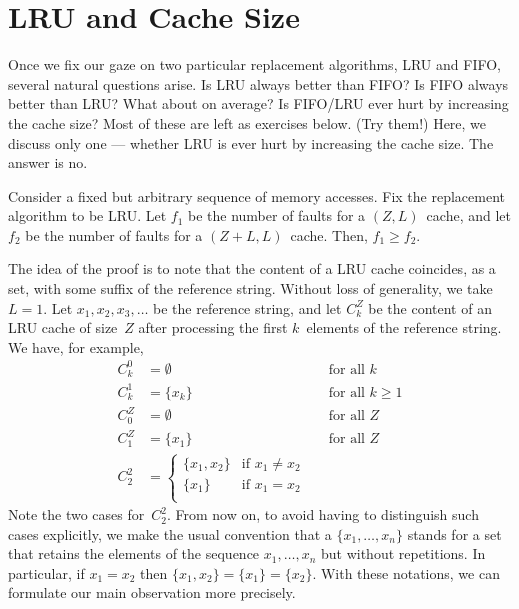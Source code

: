 \section{LRU and Cache Size}

Once we fix our gaze on two particular replacement algorithms,
  LRU and FIFO,
  several natural questions arise.
Is LRU always better than FIFO?
Is FIFO always better than LRU?
What about on average?
Is FIFO/LRU ever hurt by increasing the cache size?
Most of these are left as exercises below.
(Try them!)
Here, we discuss only one ---
  whether LRU is ever hurt by increasing the cache size.
The answer is no.

\begin{theorem}\label{thm:lru-monotone}
Consider a fixed but arbitrary sequence of memory accesses.
Fix the replacement algorithm to be LRU\null.
Let $f_1$ be the number of faults for a $(Z,L)$~cache,
  and let $f_2$ be the number of faults for a $(Z+L,L)$~cache.
Then, $f_1 \ge f_2$.
\end{theorem}

The idea of the proof is to note that the content of a LRU cache
  coincides, as a set, with some suffix of the reference string.
Without loss of generality, we take $L=1$.
Let $x_1,x_2,x_3,\ldots$ be the reference string,
  and let $C^Z_k$ be the content of an LRU cache of size~$Z$
    after processing the first $k$~elements of the reference string.
We have, for example,
\begin{align}
  C^0_k &= \emptyset
    &&\text{for all $k$}
\\
  C^1_k &= \{x_k\}
    &&\text{for all $k \ge 1$}
\\
  C^Z_0 &= \emptyset
    &&\text{for all $Z$}
\\
  C^Z_1 &= \{x_1\}
    &&\text{for all $Z$}
\\
  C^2_2 &=
  \begin{cases}
  \{x_1,x_2\} & \text{if $x_1 \ne x_2$} \\
  \{x_1\} & \text{if $x_1 = x_2$} \\
  \end{cases}
\end{align}
Note the two cases for~$C^2_2$.
From now on, to avoid having to distinguish such cases explicitly,
  we make the usual convention that a $\{x_1,\ldots,x_n\}$
  stands for a set that retains the elements of the sequence $x_1,\ldots,x_n$
    but without repetitions.
In particular, if $x_1=x_2$ then $\{x_1,x_2\}=\{x_1\}=\{x_2\}$.
With these notations,
  we can formulate our main observation more precisely.

